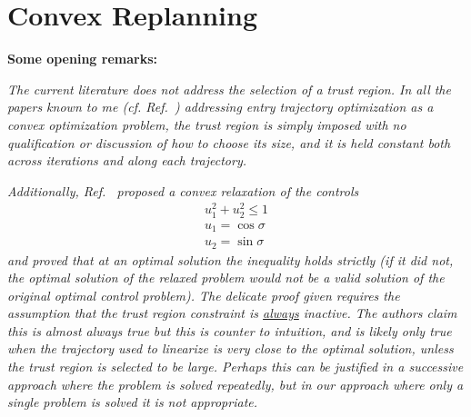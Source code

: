 \documentclass[10pt,a4paper]{article}
\begin{document}
	\section{Convex Replanning}
	\textbf{Some opening remarks:} 
	
	\textit{The current literature does not address the selection of a trust region. In all the papers known to me (cf. Ref.~\cite{SOCP Lu, SOCP WangGrant}) addressing entry trajectory optimization as a convex optimization problem, the trust region is simply imposed with no qualification or discussion of how to choose its size, and it is held constant both across iterations and along each trajectory. }
		
		\textit{Additionally, Ref.~\cite{SOCP Lu} proposed a convex relaxation of the controls} 
	\begin{align*}
		u_1^2+u_2^2\le1 \\
		u_1 = \cos\sigma\\
		u_2 = \sin\sigma
	\end{align*}
	\textit{and proved that at an optimal solution the inequality holds strictly (if it did not, the optimal solution of the relaxed problem would not be a valid solution of the original optimal control problem). The delicate proof given requires the assumption that the trust region constraint is \underline{always} inactive. The authors claim this is almost always true but this is counter to intuition, and is likely only true when the trajectory used to linearize is very close to the optimal solution, unless the trust region is selected to be large. Perhaps this can be justified in a successive approach where the problem is solved repeatedly, but in our approach where only a single problem is solved it is not appropriate.}
	
\end{document}
